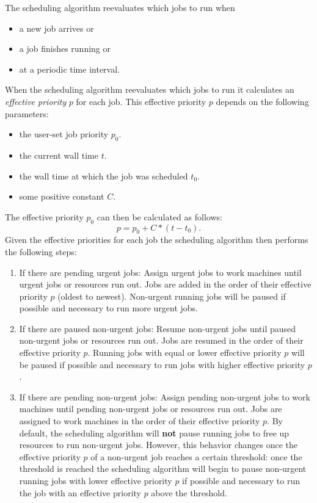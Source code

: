 The scheduling algorithm reevaluates which jobs to run when
\begin{itemize}
\item a new job arrives or
\item a job finishes running or
\item at a periodic time interval.
\end{itemize}
When the scheduling algorithm reevaluates which jobs to run it calculates an \textit{effective priority} $p$ for each job.
This effective priority $p$ depends on the following parameters:
\begin{itemize}
\item the user-set job priority $p_0$.
\item the current wall time $t$.
\item the wall time at which the job was scheduled $t_0$.
\item some positive constant $C$.
\end{itemize}
The effective priority $p_0$ can then be calculated as follows:
\begin{equation}
p = p_0 + C * (t - t_0).
\end{equation}
Given the effective priorities for each job the scheduling algorithm then performs the following steps:
\begin{enumerate}
\item If there are pending urgent jobs:
Assign urgent jobs to work machines until urgent jobs or resources run out.
Jobs are added in the order of their effective priority $p$ (oldest to newest).
Non-urgent running jobs will be paused if possible and necessary to run more urgent jobs.
\item If there are paused non-urgent jobs:
Resume non-urgent jobs until paused non-urgent jobs or resources run out.
Jobs are resumed in the order of their effective priority $p$.
Running jobs with equal or lower effective priority $p$ will be paused if possible and necessary to run jobs with higher effective priority $p$.
\item If there are pending non-urgent jobs:
Assign pending non-urgent jobs to work machines until pending non-urgent jobs or resources run out.
Jobs are assigned to work machines in the order of their effective priority $p$.
By default, the scheduling algorithm will \textbf{not} pause running jobs to free up resources to run non-urgent jobs.
However, this behavior changes once the effective priority $p$ of a non-urgent job reaches a certain threshold:
once the threshold is reached the scheduling algorithm will begin to pause non-urgent running jobs with lower effective priority $p$ if possible and necessary to run the job with an effective priority $p$ above the threshold.
\end{enumerate}
